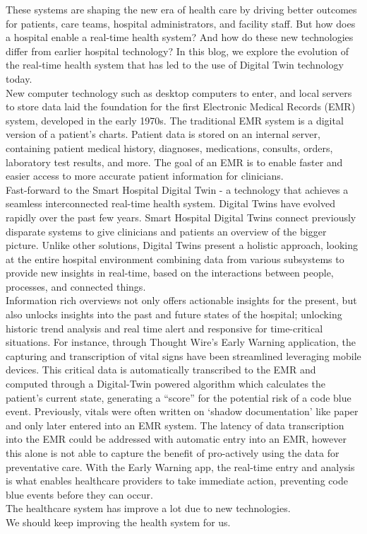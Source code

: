 \documentclass[12pt]{article}
\begin{document}
These systems are shaping the new era of health care by driving better outcomes for patients, care teams, hospital administrators, and facility staff. But how does a hospital enable a real-time health system? And how do these new technologies differ from earlier hospital technology? In this blog, we explore the evolution of the real-time health system that has led to the use of Digital Twin technology today. 
\\
New computer technology such as desktop computers to enter, and local servers to store data laid the foundation for the first Electronic Medical Records (EMR) system, developed in the early 1970s.  The traditional EMR system is a digital version of a patient’s charts. Patient data is stored on an internal server, containing patient medical history, diagnoses, medications, consults, orders, laboratory test results, and more. The goal of an EMR is to enable faster and easier access to more accurate patient information for clinicians.
\\
Fast-forward to the Smart Hospital Digital Twin - a technology that achieves a seamless interconnected real-time health system. Digital Twins have evolved rapidly over the past few years. Smart Hospital Digital Twins connect previously disparate systems to give clinicians and patients an overview of the bigger picture. Unlike other solutions, Digital Twins present a holistic approach, looking at the entire hospital environment combining data from various subsystems to provide new insights in real-time, based on the interactions between people, processes, and connected things.
\\
Information rich overviews not only offers actionable insights for the present, but also unlocks insights into the past and future states of the hospital; unlocking historic trend analysis and real time alert and responsive for time-critical situations. For instance, through Thought Wire’s Early Warning application, the capturing and transcription of vital signs have been streamlined leveraging mobile devices. This critical data is automatically transcribed to the EMR and computed through a Digital-Twin powered algorithm which calculates the patient’s current state, generating a “score” for the potential risk of a code blue event. Previously, vitals were often written on ‘shadow documentation’ like paper and only later entered into an EMR system. The latency of data transcription into the EMR could be addressed with automatic entry into an EMR, however this alone is not able to capture the benefit of pro-actively using the data for preventative care. With the Early Warning app, the real-time entry and analysis is what enables healthcare providers to take immediate action, preventing code blue events before they can occur.
\\
The healthcare system has improve a lot due to new technologies.
\\
We should keep improving the health system for us. 

 
\end{document}
